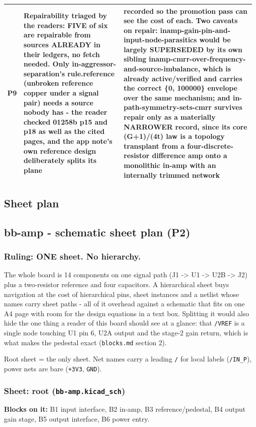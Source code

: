 \documentclass[11pt,a4paper]{article}
\begin{document}
{\begin{longtable}{lp{5.2cm}p{7.2cm}}
P9 & Repairability triaged by the readers: FIVE of six are repairable from sources ALREADY in their ledgers, no fetch needed. Only in-aggressor-separation's rule.reference (unbroken reference copper under a signal pair) needs a source nobody has - the reader checked 01258b p15 and p18 as well as the cited pages, and the app note's own reference design deliberately splits its plane & recorded so the promotion pass can see the cost of each. Two caveats on repair: inamp-gain-pin-and-input-node-parasitics would be largely SUPERSEDED by its own sibling inamp-cmrr-over-frequency-and-source-imbalance, which is already active/verified and carries the correct \{0, 100000\} envelope over the same mechanism; and in-path-symmetry-sets-cmrr survives repair only as a materially NARROWER record, since its core (G+1)/(4t) law is a topology transplant from a four-discrete-resistor difference amp onto a monolithic in-amp with an internally trimmed network \\
\bottomrule
\end{longtable}
}
\subsection*{Sheet plan}
\subsection*{bb-amp - schematic sheet plan (P2)}
\subsubsection*{Ruling: ONE sheet. No hierarchy.}
The whole board is 14 components on one signal path (J1 -\textgreater{} U1 -\textgreater{} U2B -\textgreater{} J2) plus a two-resistor reference and four capacitors. A hierarchical sheet buys navigation at the cost of hierarchical pins, sheet instances and a netlist whose names carry sheet paths - all of it overhead against a schematic that fits on one A4 page with room for the design equations in a text box. Splitting it would also hide the one thing a reader of this board should see at a glance: that \texttt{/VREF} is a single node touching U1 pin 6, U2A output and the stage-2 gain return, which is what makes the pedestal exact (\texttt{blocks.md} section 2).

Root sheet = the only sheet. Net names carry a leading \texttt{/} for local labels (\texttt{/IN\_P}), power nets are bare (\texttt{+3V3}, \texttt{GND}).

\subsubsection*{Sheet: root (\texttt{bb-amp.kicad\_sch})}
\textbf{Blocks on it:} B1 input interface, B2 in-amp, B3 reference/pedestal, B4 output gain stage, B5 output interface, B6 power entry.
\end{document}
